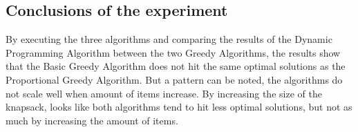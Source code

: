 \subsection*{Conclusions of the experiment}

By executing the three algorithms and comparing the results of the Dynamic Programming Algorithm between the two Greedy Algorithms,
the results show that the Basic Greedy Algorithm does not hit the same optimal solutions as the Proportional Greedy Algorithm. But a 
pattern can be noted, the algorithms do not scale well when amount of items increase. By increasing the size of the knapsack, looks 
like both algorithms tend to hit less optimal solutions, but not as much by increasing the amount of items.